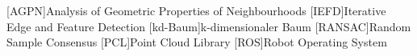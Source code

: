 \newpage
\tableofcontents
\newpage
{}

\begin{acronym}[Grundlagen]
[AGPN]{Analysis of Geometric Properties of Neighbourhoods}
[IEFD]{Iterative Edge and Feature Detection}
[kd-Baum]{k-dimensionaler Baum}
[RANSAC]{Random Sample Consensus}
[PCL]{Point Cloud Library}
[ROS]{Robot Operating System}
\end{acronym}
\newpage
\listoffigures
\listoftables